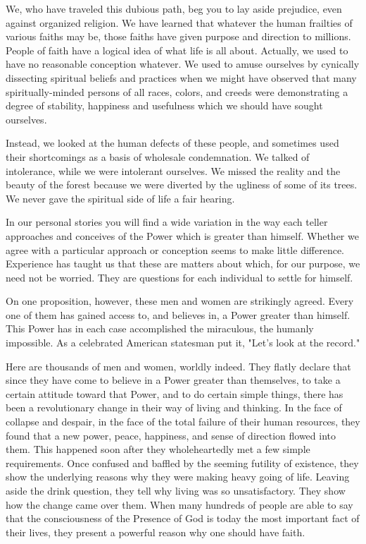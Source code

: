 \begin{biblechapter}
    We, who have traveled this dubious path, beg you to lay aside prejudice, 
even against organized religion. 
We have learned that whatever the human frailties of various faiths may be, 
those faiths have given purpose and direction to millions.  
People of faith have a logical idea of what life is all about. 
Actually, we used to have no reasonable conception whatever. 
We used to amuse ourselves by cynically dissecting spiritual beliefs and practices 
when we might have observed that many spiritually-minded persons of all races, colors, and creeds 
were demonstrating a degree of stability, happiness and usefulness 
which we should have sought ourselves.

Instead, we looked at the human defects of these people, 
and sometimes used their shortcomings as a basis of wholesale condemnation. 
We talked of intolerance, while we were intolerant ourselves. 
We missed the reality and the beauty of the forest 
because we were diverted by the ugliness of some of its trees. 
We never gave the spiritual side of life a fair hearing.

In our personal stories you will find a wide variation in the way each teller 
approaches and conceives of the Power which is greater than himself. 
Whether we agree with a particular approach or conception seems to make little difference. 
Experience has taught us that these are matters about which, for our purpose, we need not be worried. 
They are questions for each individual to settle for himself.
\end{biblechapter}


\begin{biblechapter}
    On one proposition, however, these men and women are strikingly agreed. 
Every one of them has gained access to, and believes in, a Power greater than himself. 
This Power has in each case accomplished the miraculous, the humanly impossible. 
As a celebrated American statesman put it, 
"Let's look at the record."

Here are thousands of men and women, worldly indeed. 
They flatly declare that since they have come to believe in a Power greater than themselves, 
to take a certain attitude toward that Power, 
and to do certain simple things, 
there has been a revolutionary change 
in their way of living and thinking. 
In the face of collapse and despair, 
in the face of the total failure of their human resources, 
they found that a new power, peace, happiness, and sense of direction flowed into them. 
This happened soon after they wholeheartedly met a few simple requirements. 
Once confused and baffled by the seeming futility of existence, 
they show the underlying reasons why they were making heavy going of life. 
Leaving aside the drink question, they tell why living was so unsatisfactory. 
They show how the change came over them. 
When many hundreds of people are able to say that the consciousness of the Presence of God 
is today the most important fact of their lives, 
they present a powerful reason why one should have faith.
\end{biblechapter}


